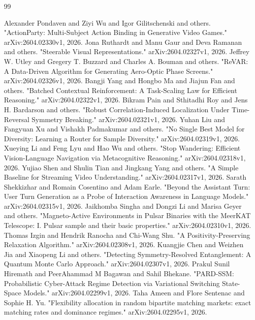 \documentclass[11pt,a4paper]{article}
\begin{document}
\begin{thebibliography}{99}

 Alexander Pondaven and Ziyi Wu and Igor Gilitschenski and others. "ActionParty: Multi-Subject Action Binding in Generative Video Games." arXiv:2604.02330v1, 2026.
 Jona Ruthardt and Manu Gaur and Deva Ramanan and others. "Steerable Visual Representations." arXiv:2604.02327v1, 2026.
 Jeffrey W. Utley and Gregery T. Buzzard and Charles A. Bouman and others. "ReVAR: A Data-Driven Algorithm for Generating Aero-Optic Phase Screens." arXiv:2604.02326v1, 2026.
 Bangji Yang and Hongbo Ma and Jiajun Fan and others. "Batched Contextual Reinforcement: A Task-Scaling Law for Efficient Reasoning." arXiv:2604.02322v1, 2026.
 Bikram Pain and Sthitadhi Roy and Jens H. Bardarson and others. "Robust Correlation-Induced Localization Under Time-Reversal Symmetry Breaking." arXiv:2604.02321v1, 2026.
 Yuhan Liu and Fangyuan Xu and Vishakh Padmakumar and others. "No Single Best Model for Diversity: Learning a Router for Sample Diversity." arXiv:2604.02319v1, 2026.
 Xueying Li and Feng Lyu and Hao Wu and others. "Stop Wandering: Efficient Vision-Language Navigation via Metacognitive Reasoning." arXiv:2604.02318v1, 2026.
 Yujiao Shen and Shulin Tian and Jingkang Yang and others. "A Simple Baseline for Streaming Video Understanding." arXiv:2604.02317v1, 2026.
 Sarath Shekkizhar and Romain Cosentino and Adam Earle. "Beyond the Assistant Turn: User Turn Generation as a Probe of Interaction Awareness in Language Models." arXiv:2604.02315v1, 2026.
 Jaikhomba Singha and Dongzi Li and Marisa Geyer and others. "Magneto-Active Environments in Pulsar Binaries with the MeerKAT Telescope: I. Pulsar sample and their basic properties." arXiv:2604.02310v1, 2026.
 Thomas Izgin and Hendrik Ranocha and Chi-Wang Shu. "A Positivity-Preserving Relaxation Algorithm." arXiv:2604.02308v1, 2026.
 Kuangjie Chen and Weizhen Jia and Xiaopeng Li and others. "Detecting Symmetry-Resolved Entanglement: A Quantum Monte Carlo Approach." arXiv:2604.02307v1, 2026.
 Prakul Sunil Hiremath and PeerAhammad M Bagawan and Sahil Bhekane. "PARD-SSM: Probabilistic Cyber-Attack Regime Detection via Variational Switching State-Space Models." arXiv:2604.02299v1, 2026.
 Taha Ameen and Flore Sentenac and Sophie H. Yu. "Flexibility allocation in random bipartite matching markets: exact matching rates and dominance regimes." arXiv:2604.02295v1, 2026.

\end{thebibliography}
\end{document}
